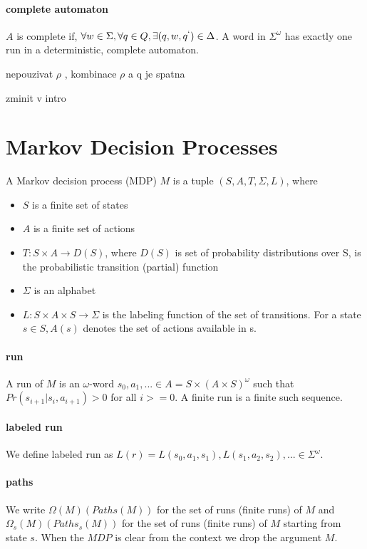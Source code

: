 \documentclass[
	digital
nolof, nolot
]{fithesis3}
\begin{document}
		\paragraph{complete automaton}
		$A$ is complete if, $\forall w \in \Sigma, \forall q \in Q, \exists (q, w, q^`)\in\Delta$. A word in $\Sigma^\omega$ has exactly one run in a deterministic, complete automaton. 
		
		nepouzivat $\rho$ , kombinace $\rho$ a q je spatna
		
		zminit v intro
		\section{Markov Decision Processes}
		A Markov decision process (MDP) $M$
		is a tuple $(S, A, T, \Sigma, L)$, where
		\begin{itemize}
			\item $S$ is a finite set of states
			\item $A$ is a finite set of actions
			\item $T:S\times A \rightarrow D(S)$, where $D(S)$ is set of probability distributions over S, is  the probabilistic transition (partial) function
			\item $\Sigma$ is an alphabet
			\item $L:S\times A \times S \rightarrow \Sigma$ is the labeling function of the set of transitions.
			For a state $s \in S, A(s)$ denotes the set of actions available in s.
		\end{itemize}
		\paragraph{run}
		A run of $M$ is an $\omega$-word 
		$s_0,a_1,...\in A=S \times (A \times S)^\omega$
		such that $Pr(s_{i+1}|s_i, a_{i+1})>0$ for all $i >= 0$. A finite run is a finite such sequence.
		\paragraph{labeled run}
		We define labeled run as
		$L(r)=L(s_0,a_1,s_1), L(s_1, a_2, s_2),... \in \Sigma^\omega$.
		\paragraph{paths}
		We write $\Omega(M)(Paths(M))$
		for the set of runs (finite runs) of $M$ and
		$\Omega_s(M)(Paths_s(M))$ for the set of runs (finite runs)
		of $M$ starting from state $s$. When the $MDP$ is clear from the context we drop the argument $M$.
\end{document}
